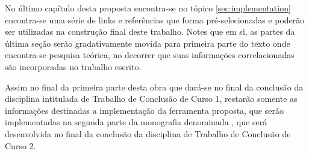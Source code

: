 {    No último capítulo desta proposta encontra-se no tópico \autoref{sec:implementation} encontra-se
    uma série de links e referências que forma pré-selecionadas e poderão ser utilizadas na
    construção final deste trabalho. Notes que em si, as partes da última seção serão gradativamente
    movida para primeira parte do texto onde encontra-se pesquisa teórica, no decorrer que suas
    informações correlacionadas são incorporadas no trabalho escrito.

    Assim no final da primeira parte desta obra que dará-se no final da conclusão da disciplina
    intitulada de Trabalho de Conclusão de Curso 1, restarão somente as informações destinadas a
    implementação da ferramenta proposta, que serão implementadas na segunda parte da monografia
    denominada , que será desenvolvida no final da conclusão da
    disciplina de Trabalho de Conclusão de Curso 2.
}


